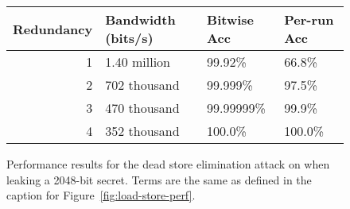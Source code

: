 \begin{figure}
  \small
  \begin{tabular}{ r | l | l | l }
    Redundancy & Bandwidth (bits/s) & Bitwise Acc & Per-run Acc \\ \hline
    1          & 1.40 million       & 99.92\%     & 66.8\%      \\
    2          & 702 thousand       & 99.999\%    & 97.5\%      \\
    3          & 470 thousand       & 99.99999\%  & 99.9\%       \\
    4          & 352 thousand       & 100.0\%     & 100.0\%      \\
  \end{tabular}
  \caption{
    Performance results for the dead store elimination attack on {\CLANG} when
    leaking a 2048-bit secret.
    Terms are the same as defined in the caption for Figure~\ref{fig:load-store-perf}.
  }
  \label{fig:clang-dse-perf}
\end{figure}

